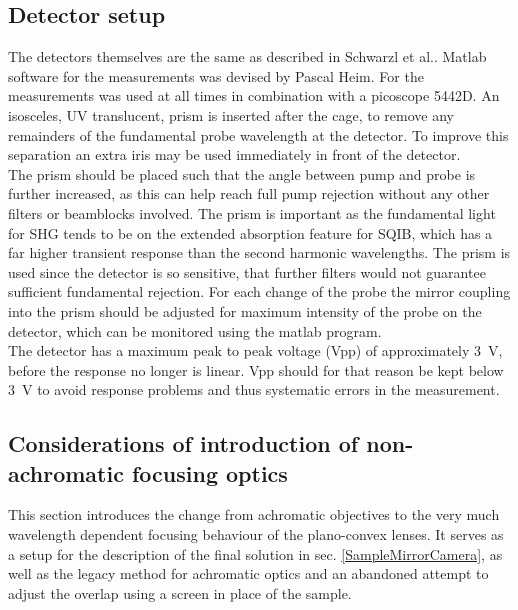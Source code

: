 \documentclass[twoside,openright,listof=numbered]{scrreprt}
\begin{document}
\subsection{Detector setup}
The detectors themselves are the same as described in Schwarzl et al.\cite{Schwarzl2022}. Matlab software for the measurements was devised by Pascal Heim. For the measurements  was used at all times in combination with a picoscope 5442D. An isosceles, UV translucent, prism is inserted after the cage, to remove any remainders of the fundamental probe wavelength at the detector. To improve this separation an extra iris may be used immediately in front of the detector.\\
The prism should be placed such that the angle between pump and probe is further increased, as this can help reach full pump rejection without any other filters or beamblocks involved. The prism is important as the fundamental light for SHG tends to be on the extended absorption feature for SQIB, which has a far higher transient response than the second harmonic wavelengths. The prism is used since the detector is so sensitive, that further filters would not guarantee sufficient fundamental rejection. For each change of the probe the mirror coupling into the prism should be adjusted for maximum intensity of the probe on the detector, which can be monitored using the  matlab program.\\
The detector has a maximum peak to peak voltage (Vpp) of approximately \qty	{3}{\volt}, before the response no longer is linear. Vpp should for that reason be kept below \qty{3}{\volt} to avoid response problems and thus systematic errors in the measurement.
\subsection{Considerations of introduction of non-achromatic focusing optics}
This section introduces the change from achromatic objectives to the very much wavelength dependent focusing behaviour of the plano-convex lenses. It serves as a setup for the description of the final solution in sec. \ref{SampleMirrorCamera}, as well as the legacy method for achromatic optics and an abandoned attempt to adjust the overlap using a screen in place of the sample.
\end{document}
